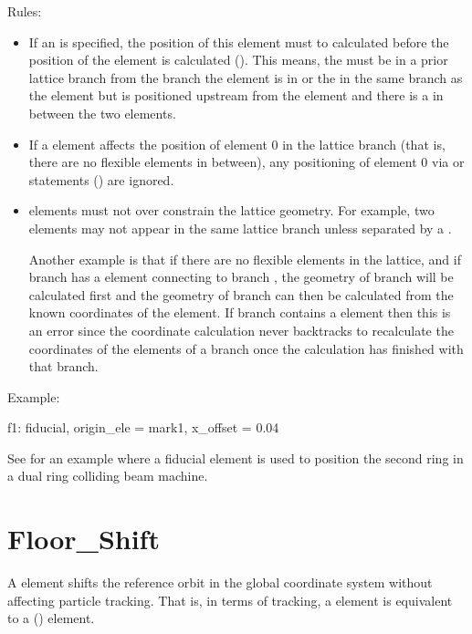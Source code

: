 Rules: 
  \begin{itemize}
  \item
If an  is specified, the position of this element must to calculated before the
position of the  element is calculated (). This means, the 
must be in a prior lattice branch from the branch the  element is in or the
 in the same branch as the  element but is positioned upstream from the
 element and there is a   in between the two elements.
  \item
If a  element affects the position of element 0 in the lattice branch (that is, there
are no flexible  elements in between), any positioning of element 0 via  or
 statements () are ignored.
  \item
{} elements must not over constrain the lattice geometry.  For example, two 
elements may not appear in the same lattice branch unless separated by a  .

Another example is that if there are no flexible  elements in the lattice, and if branch
 has a  element connecting to branch , the geometry of branch  will be
calculated first and the geometry of branch  can then be calculated from the known coordinates
of the  element. If branch  contains a  element then this is an error
since the coordinate calculation never backtracks to recalculate the coordinates of the elements of
a branch once the calculation has finished with that branch.
  \end{itemize}

Example:
\begin{example}
  f1: fiducial, origin_ele = mark1, x_offset = 0.04
\end{example}
See  for an example where a fiducial element is
used to position the second ring in a dual ring colliding beam 
machine.

\newpage

\section{Floor_Shift}
\label{s:floor.ele}

A  element shifts the reference orbit in the global coordinate system without
affecting particle tracking. That is, in terms of tracking, a  element is equivalent
to a  () element. 

